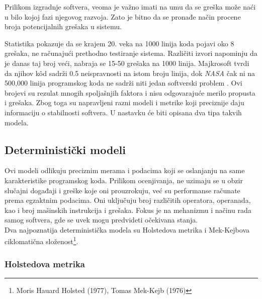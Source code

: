\documentclass[a4paper]{article}
\begin{document}
Prilikom izgradnje softvera, veoma je važno imati na umu da se greška može naći u bilo kojoj fazi njegovog razvoja. Zato je bitno da se pronađe način procene broja potencijalnih grešaka u sistemu.

Statistika pokazuje da se krajem 20. veka na 1000 linija koda pojavi oko 8 grešaka, ne računajući prethodno testiranje sistema. Različiti izvori napominju da je danas taj broj veći, nabraja se 15-50 grešaka na 1000 linija. Majkrosoft tvrdi da njihov k\^{o}d sadrži 0.5 neispravnosti na istom broju linija, dok \emph{NASA} čak ni na 500,000 linija programskog koda ne sadrži niti jedan softverski problem \cite{Statistika_prosek_gresaka}. Ovi brojevi su rezulat mnogih spoljašnjih faktora i nisu odgovarajuće merilo propusta i grešaka. Zbog toga su napravljeni razni modeli i metrike koji preciznije daju informaciju o stabilnosti softvera. U nastavku će biti opisana dva tipa takvih modela.\\


\subsection{Deterministički modeli}
\label{sec:deterministicki}

Ovi modeli odlikuju preciznim merama i podacima koji se oslanjanju na same karakteristike programskog koda. Prilikom ocenjivanja, ne uzimaju se u obzir slučajni događaji i greške koje oni prouzrokuju, već su performanse računate prema egzaktnim podacima. Oni uključuju broj različitih operatora, operanada, kao i broj mašinskih instrukcija i grešaka. Fokus je na mehanizmu i načinu rada samog softvera, gde se uvek mogu predvideti očekivana stanja.\\
Dva najpoznatija deterministička modela su Holstedova metrika i Mek-Kejbova ciklomatična složenost\footnote{ Moris Hauard Holsted (1977), Tomas Mek-Kejb (1976)}.

\subsubsection{Holstedova metrika}
\label{subsec:holsted}
\end{document}

